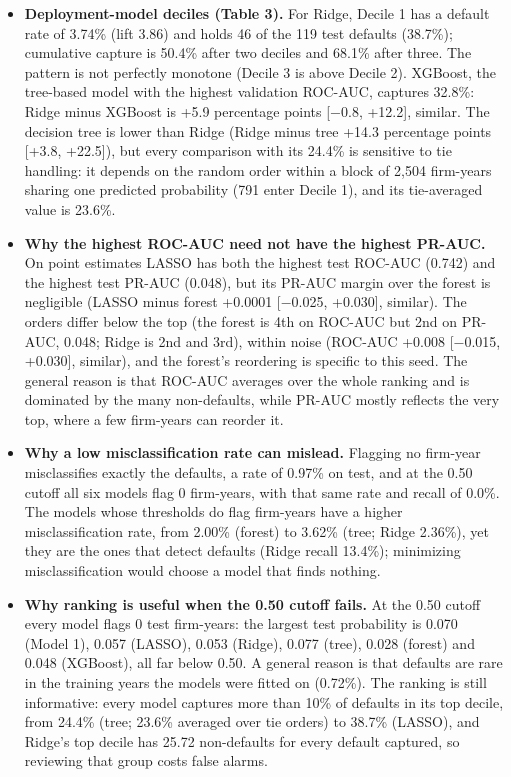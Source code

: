 \documentclass[9pt,letterpaper]{extarticle}
\begin{document}
\begin{itemize}
  \item \textbf{Deployment-model deciles (Table 3).} For Ridge, Decile 1 has a default rate of 3.74\% (lift 3.86) and holds 46 of the 119 test defaults (38.7\%); cumulative capture is 50.4\% after two deciles and 68.1\% after three. The pattern is not perfectly monotone (Decile 3 is above Decile 2). XGBoost, the tree-based model with the highest validation ROC-AUC, captures 32.8\%: Ridge minus XGBoost is +5.9 percentage points [$-$0.8, +12.2], similar. The decision tree is lower than Ridge (Ridge minus tree +14.3 percentage points [+3.8, +22.5]), but every comparison with its 24.4\% is sensitive to tie handling: it depends on the random order within a block of 2,504 firm-years sharing one predicted probability (791 enter Decile 1), and its tie-averaged value is 23.6\%.
  \item \textbf{Why the highest ROC-AUC need not have the highest PR-AUC.} On point estimates LASSO has both the highest test ROC-AUC (0.742) and the highest test PR-AUC (0.048), but its PR-AUC margin over the forest is negligible (LASSO minus forest +0.0001 [$-$0.025, +0.030], similar). The orders differ below the top (the forest is 4th on ROC-AUC but 2nd on PR-AUC, 0.048; Ridge is 2nd and 3rd), within noise (ROC-AUC +0.008 [$-$0.015, +0.030], similar), and the forest's reordering is specific to this seed. The general reason is that ROC-AUC averages over the whole ranking and is dominated by the many non-defaults, while PR-AUC mostly reflects the very top, where a few firm-years can reorder it.
  \item \textbf{Why a low misclassification rate can mislead.} Flagging no firm-year misclassifies exactly the defaults, a rate of 0.97\% on test, and at the 0.50 cutoff all six models flag 0 firm-years, with that same rate and recall of 0.0\%. The models whose thresholds do flag firm-years have a higher misclassification rate, from 2.00\% (forest) to 3.62\% (tree; Ridge 2.36\%), yet they are the ones that detect defaults (Ridge recall 13.4\%); minimizing misclassification would choose a model that finds nothing.
  \item \textbf{Why ranking is useful when the 0.50 cutoff fails.} At the 0.50 cutoff every model flags 0 test firm-years: the largest test probability is 0.070 (Model 1), 0.057 (LASSO), 0.053 (Ridge), 0.077 (tree), 0.028 (forest) and 0.048 (XGBoost), all far below 0.50. A general reason is that defaults are rare in the training years the models were fitted on (0.72\%). The ranking is still informative: every model captures more than 10\% of defaults in its top decile, from 24.4\% (tree; 23.6\% averaged over tie orders) to 38.7\% (LASSO), and Ridge's top decile has 25.72 non-defaults for every default captured, so reviewing that group costs false alarms.

\end{itemize}
\end{document}
